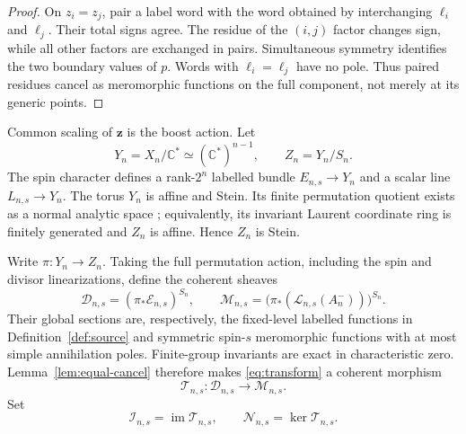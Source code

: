 \documentclass[11pt,reqno]{amsart}
\theoremstyle{definition}
\theoremstyle{remark}
\newcommand{\C}{\mathbb C}
\newcommand{\cT}{\mathcal T}
\newcommand{\im}{\operatorname{im}}
\begin{document}
\begin{proof}
On $z_i=z_j$, pair a label word with the word obtained by interchanging
$\ell_i$ and $\ell_j$.  Their total signs agree.  The residue of the
$(i,j)$ factor changes sign, while all other factors are exchanged in pairs.
Simultaneous symmetry identifies the two boundary values of $p$.  Words with
$\ell_i=\ell_j$ have no pole.  Thus paired residues cancel as meromorphic
functions on the full component, not merely at its generic points.
\end{proof}

Common scaling of $\boldsymbol z$ is the boost action.  Let
\begin{equation}
 Y_n=X_n/\C^*\simeq(\C^*)^{n-1},
 \qquad Z_n=Y_n/S_n.
 \label{eq:YZ}
\end{equation}
The spin character defines a rank-$2^n$ labelled bundle
$E_{n,s}\to Y_n$ and a scalar line $L_{n,s}\to Y_n$.  The torus $Y_n$ is
affine and Stein.  Its finite permutation quotient exists as a normal analytic
space \cite{SHC_1953-1954__6__A12_0}; equivalently, its invariant Laurent
coordinate ring is finitely generated and $Z_n$ is affine.  Hence $Z_n$ is
Stein.

Write $\pi:Y_n\to Z_n$.  Taking the full permutation action, including the
spin and divisor linearizations, define the coherent sheaves
\begin{equation}
 \mathscr D_{n,s}=(\pi_*\mathscr E_{n,s})^{S_n},
 \qquad
 \mathscr M_{n,s}
 =\bigl(\pi_*(\mathscr L_{n,s}(A_n^-))\bigr)^{S_n}.
 \label{eq:DM}
\end{equation}
Their global sections are, respectively, the fixed-level labelled functions
in Definition~\ref{def:source} and symmetric spin-$s$ meromorphic functions
with at most simple annihilation poles.  Finite-group invariants are exact in
characteristic zero.  Lemma~\ref{lem:equal-cancel} therefore makes
\eqref{eq:transform} a coherent morphism
\begin{equation}
 \cT_{n,s}:\mathscr D_{n,s}\longrightarrow\mathscr M_{n,s}.
 \label{eq:sheaf-T}
\end{equation}
Set
\begin{equation}
 \mathscr I_{n,s}=\im\cT_{n,s},
 \qquad
 \mathscr N_{n,s}=\ker\cT_{n,s}.
 \label{eq:IN}
\end{equation}
\end{document}
